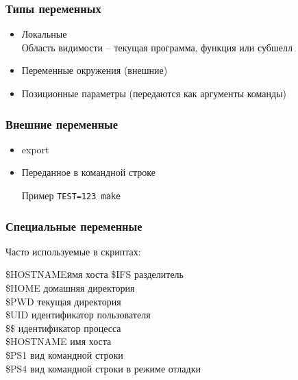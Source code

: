 \begin{frame}
	\frametitle{Типы переменных}
	\begin{itemize}
		\item Локальные\\
		    Область видимости -- текущая программа, функция или субшелл
		\item Переменные окружения (внешние)
		\item Позиционные параметры (передаются как аргументы команды)
	\end{itemize}
\end{frame}

\begin{frame}
	\frametitle{Внешние переменные}


	\begin{itemize}
		\item export
		\item Переданное в командной строке \\
			\begin{block}{Пример}
				{\tt TEST=123 make}
			\end{block}
	\end{itemize}
\end{frame}

\begin{frame}[fragile]
	\frametitle{Специальные переменные}
	Часто используемые в скриптах:
\begin{tabbing}
\hspace{1cm}\= \alert{\$HOSTNAME}\quad \= имя хоста\kill
            \> \alert{\$IFS}\quad\> разделитель \\[5pt] 
            \> \alert{\$HOME}\quad \> домашняя директория\\[5pt] 
            \> \alert{\$PWD}\quad \> текущая директория\\[5pt]
            \> \alert{\$UID}\quad \> идентификатор пользователя \\[5pt]
            \> \alert{\$\$}\quad \> идентификатор процесса\\[5pt]
            \> \alert{\$HOSTNAME}\quad \> имя хоста\\[5pt]
            \> \alert{\$PS1}\quad \> вид командной строки\\[5pt]
            \> \alert{\$PS4}\quad \> вид командной строки в режиме отладки
\end{tabbing}

    
\end{frame}


